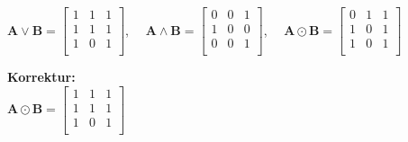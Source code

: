 \documentclass[12pt]{scrartcl}
\begin{document}
$\mathbf{A} \lor \mathbf{B} =
\begin{bmatrix}
    1 & 1 & 1 \\
    1 & 1 & 1 \\
    1 & 0 & 1 \\
\end{bmatrix}
$,
$\quad \mathbf{A} \land \mathbf{B} =
\begin{bmatrix}
    0 & 0 & 1 \\
    1 & 0 & 0 \\
    0 & 0 & 1 \\
\end{bmatrix}
$,
$\quad \mathbf{A} \odot \mathbf{B} =
\begin{bmatrix}
    0 & 1 & 1 \\
    1 & 0 & 1 \\
    1 & 0 & 1 \\
\end{bmatrix}
$\\

\vspace{25px}

\textbf{Korrektur:}\\
$\mathbf{A} \odot \mathbf{B} =
\begin{bmatrix}
    1 & 1 & 1 \\
    1 & 1 & 1 \\
    1 & 0 & 1 \\
\end{bmatrix}
$




% 
\end{document}
